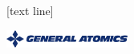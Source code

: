 \documentclass[10pt,mathserif,xcolor={table,dvipsnames},aspectratio=169]{beamer}
\begin{document}

[text line]{
  \parbox{\linewidth}{\vspace*{-25pt}
        \includegraphics[width=4cm]{../figures/General-Atomics.pdf}
        \hfill }}
\end{document}
